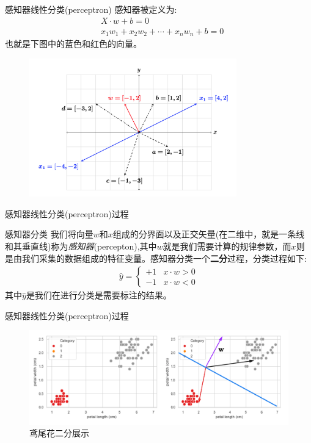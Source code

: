 \documentclass[handout]{ctexbeamer}
\begin{document}
\begin{frame}{感知器线性分类(perceptron)}
感知器被定义为:
\begin{align*}
	& X \cdot w + b  = 0 \\
	& x_1 w_1 + x_2 w_2 + \cdots + x_n w_n + b  =0
\end{align*}	
也就是下图中的蓝色和红色的向量。
\begin{figure}[H]
	\centering
	\includegraphics[width=0.8\textwidth]{fig/C2C2dotprodt}
\end{figure}	
\end{frame}

\begin{frame}{感知器线性分类(perceptron)过程}
	\begin{block}{感知器分类}
	我们将向量$w$和$x$组成的分界面以及正交矢量(在二维中，就是一条线和其垂直线)称为\textit{感知器}(percepton),其中$w$就是我们需要计算的规律参数，而$x$则是由我们采集的数据组成的特征变量。感知器分类一个\textbf{二分}过程，分类过程如下:
	\begin{align*}
		\hat{y} = \begin{cases}
			+1 & x \cdot w > 0 \\
			-1 & x \cdot w < 0
		\end{cases}
	\end{align*}
	其中$\hat{y}$是我们在进行分类是需要标注的结果。	
	\end{block}

\end{frame}

\begin{frame}{感知器线性分类(perceptron)过程}
	\begin{figure}[H]
		\centering
		\includegraphics[width=\textwidth]{fig/C2prevIris2}
		\caption{鸢尾花二分展示}
	\end{figure}
\end{frame}
\end{document}
